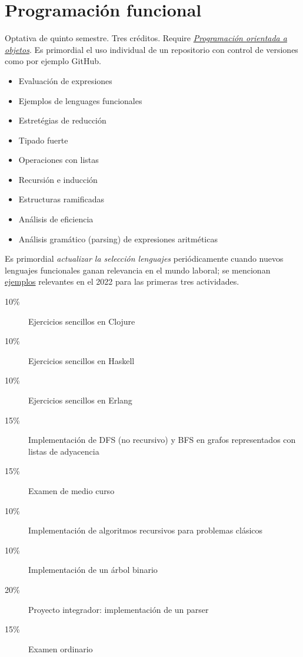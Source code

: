\documentclass{article}
\begin{document}
\begin{multicols}{4}
\vfill\null \columnbreak

\hypertarget{pf}{\section*{Programaci\'{o}n funcional}}

Optativa de quinto semestre. Tres cr\'{e}ditos. Require
\hyperlink{poao}{\em Programaci\'{o}n orientada a objetos}. Es
primordial el uso individual de un repositorio con control de
versiones como por ejemplo GitHub.

\begin{itemize}
\item{Evaluaci\'{o}n de expresiones}
\item{Ejemplos de lenguages funcionales}
\item{Estret\'{e}gias de reducci\'{o}n}
\item{Tipado fuerte}
\item{Operaciones con listas}
\item{Recursi\'{o}n e inducci\'{o}n}
\item{Estructuras ramificadas}
\item{An\'{a}lisis de eficiencia}
\item{An\'{a}lisis gram\'{a}tico (parsing) de expresiones aritm\'{e}ticas}
\end{itemize}

Es primordial {\em actualizar la selecci\'{o}n lenguajes} peri\'{o}dicamente
cuando nuevos lenguajes funcionales ganan relevancia en el mundo
laboral; se mencionan \underline{ejemplos} relevantes en el 2022 para
las primeras tres actividades.

\begin{description}
\item[10\%]{Ejercicios sencillos en Clojure}
\item[10\%]{Ejercicios sencillos en Haskell}
\item[10\%]{Ejercicios sencillos en Erlang}  
\item[15\%]{Implementaci\'{o}n de DFS (no recursivo) y BFS en grafos representados con listas de adyacencia}  
\item[15\%]{Examen de medio curso}
\item[10\%]{Implementaci\'{o}n de algoritmos recursivos para problemas
  cl\'{a}sicos}
\item[10\%]{Implementaci\'{o}n de un \'{a}rbol binario}
\item[20\%]{Proyecto integrador: implementaci\'{o}n de un parser}
\item[15\%]{Examen ordinario}
\end{description}  


\end{multicols}
\end{document}
